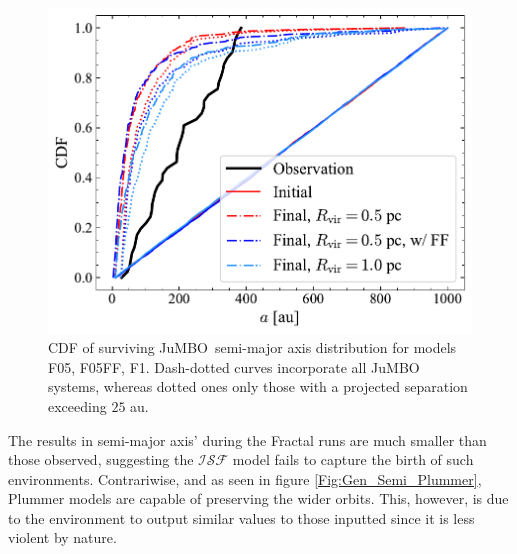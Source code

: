 \documentclass[aa]{lib/aa}
\newcommand{\jumbo}{\mbox{JuMBO}}
\begin{document}
   \begin{figure}
    \centering
        \includegraphics[width=\columnwidth]{figures/Fractal_General_sem_axis.pdf}
        \caption{CDF of surviving \jumbo\, semi-major axis distribution for models F05, F05FF, F1. Dash-dotted curves incorporate all \jumbo\, systems, whereas dotted ones only those with a projected separation exceeding $25$ au.}
         \label{Fig:Gen_Semi_Fractal}
   \end{figure}
    
    The results in semi-major axis' during the Fractal runs are much smaller than those observed, suggesting the $\mathcal{ISF}$ model fails to capture the birth of such environments. Contrariwise, and as seen in figure \ref{Fig:Gen_Semi_Plummer}, Plummer models are capable of preserving the wider orbits. This, however, is due to the environment to output similar values to those inputted since it is less violent by nature.
   
\end{document}
